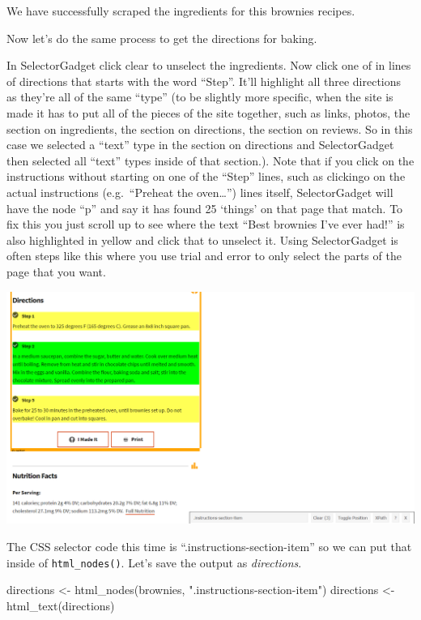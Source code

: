 \documentclass[
]{krantz}
\makeatletter
\newenvironment{Shaded}{\begin{snugshade}}{\end{snugshade}}
\newcommand{\FunctionTok}[1]{\textcolor[rgb]{0,0,0}{#1}}
\newcommand{\NormalTok}[1]{#1}
\newcommand{\OtherTok}[1]{\textcolor[rgb]{0.37,0.37,0.37}{#1}}
\newcommand{\StringTok}[1]{\textcolor[rgb]{0.5,0.5,0.5}{#1}}
\newenvironment{kframe}{%
\medskip{}
\setlength{\fboxsep}{.8em}
 \def\at@end@of@kframe{}%
 \ifinner\ifhmode%
  \def\at@end@of@kframe{\end{minipage}}%
  \begin{minipage}{\columnwidth}%
 \fi\fi%
 \def\FrameCommand##1{\hskip\@totalleftmargin \hskip-\fboxsep
 \colorbox{shadecolor}{##1}\hskip-\fboxsep
     \hskip-\linewidth \hskip-\@totalleftmargin \hskip\columnwidth}%
 \MakeFramed {\advance\hsize-\width
   \@totalleftmargin\z@ \linewidth\hsize
   \@setminipage}}%
 {\par\unskip\endMakeFramed%
 \at@end@of@kframe}
\renewenvironment{Shaded}{\begin{kframe}}{\end{kframe}}
\makeatother
\begin{document}
We have successfully scraped the ingredients for this brownies recipes.

Now let's do the same process to get the directions for baking.

In SelectorGadget click clear to unselect the ingredients. Now click one of in lines of directions that starts with the word ``Step''. It'll highlight all three directions as they're all of the same ``type'' (to be slightly more specific, when the site is made it has to put all of the pieces of the site together, such as links, photos, the section on ingredients, the section on directions, the section on reviews. So in this case we selected a ``text'' type in the section on directions and SelectorGadget then selected all ``text'' types inside of that section.). Note that if you click on the instructions without starting on one of the ``Step'' lines, such as clickingo on the actual instructions (e.g.~``Preheat the oven\ldots{}'') lines itself, SelectorGadget will have the node ``p'' and say it has found 25 `things' on that page that match. To fix this you just scroll up to see where the text ``Best brownies I've ever had!'' is also highlighted in yellow and click that to unselect it. Using SelectorGadget is often steps like this where you use trial and error to only select the parts of the page that you want.

\includegraphics{images/brownies_5.PNG}

The CSS selector code this time is ``.instructions-section-item'' so we can put that inside of \texttt{html\_nodes()}. Let's save the output as \emph{directions}.

\begin{Shaded}
\begin{Highlighting}[]
\NormalTok{directions }\OtherTok{\textless{}{-}} \FunctionTok{html\_nodes}\NormalTok{(brownies, }\StringTok{".instructions{-}section{-}item"}\NormalTok{)}
\NormalTok{directions }\OtherTok{\textless{}{-}} \FunctionTok{html\_text}\NormalTok{(directions)}
\end{Highlighting}
\end{Shaded}
\end{document}
